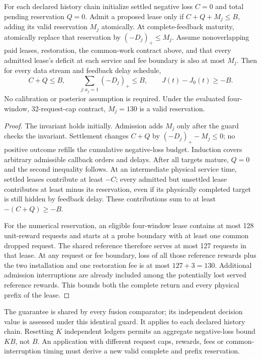 \begin{theorem}
\label{thm:v2-pathwise-paid-loss}
For each declared history chain initialize settled negative loss
$C=0$ and total pending reservation $Q=0$. Admit a proposed lease only
if $C+Q+M_j\leq B$, adding its valid reservation $M_j$ atomically.
At complete-feedback maturity, atomically replace that reservation by
$(-D_j)_+\leq M_j$. Assume nonoverlapping paid leases, restoration,
the common-work contract above, and that every admitted lease's deficit
at each service and fee boundary is also at most $M_j$. Then for every
data stream and feedback delay schedule,
\begin{equation}
 C+Q\leq B,\qquad
 \sum_{j:a_j=1}(-D_j)_+\leq B,\qquad
 J(t)-J_0(t)\geq-B.
 \label{eq:v2-common-loss-budget}
\end{equation}
No calibration or posterior assumption is required. Under the evaluated
four-window, 32-request-cap contract, $M_j=130$ is a valid reservation.
\end{theorem}
\begin{proof}
The invariant holds initially. Admission adds $M_j$ only after the
guard checks the invariant. Settlement changes $C+Q$ by
$(-D_j)_+-M_j\leq0$; no positive outcome refills the cumulative
negative-loss budget. Induction covers arbitrary admissible callback
orders and delays. After all targets mature, $Q=0$ and the second
inequality follows. At an intermediate physical service time, settled
leases contribute at least $-C$; every admitted but unsettled lease
contributes at least minus its reservation, even if its physically
completed target is still hidden by feedback delay. These contributions
sum to at least $-(C+Q)\geq-B$.

For the numerical reservation, an eligible four-window lease contains
at most 128 unit-reward requests and starts at a probe boundary with at
least one common dropped request. The shared reference therefore serves
at most 127 requests in that lease. At any request or fee boundary, loss
of all those reference rewards plus the two installation and one
restoration fee is at most $127+3=130$. Additional admission
interruptions are already included among the potentially lost served
reference rewards. This bounds both the complete return and every
physical prefix of the lease.
\end{proof}
The guarantee is shared by every fusion comparator; its independent
decision value is assessed under this identical guard. It applies to
each declared history chain. Resetting $K$ independent ledgers permits
an aggregate negative-loss bound $KB$, not $B$. An application with
different request caps, rewards, fees or common-interruption timing
must derive a new valid complete and prefix reservation.

